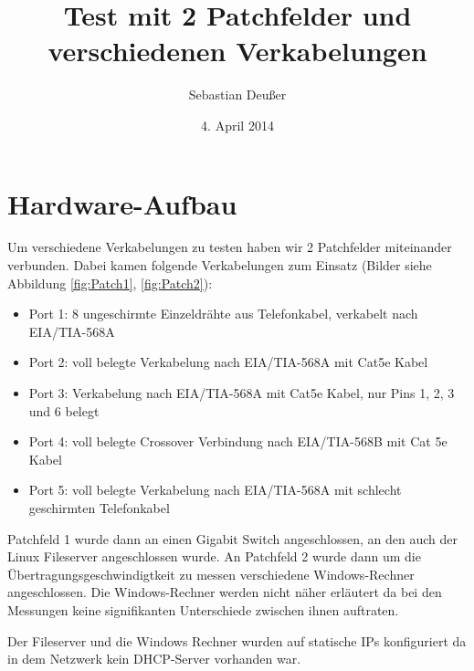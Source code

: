 \documentclass[11pt,a4paper,titlepage]{scrartcl} %
\title{Test mit 2 Patchfelder und verschiedenen Verkabelungen}
\author{Sebastian Deußer}
\date{4. April 2014} %
\begin{document}
\maketitle %

\pagestyle{fancy}
\lhead{}
\chead{\leftmark}
\rhead{}
\cfoot{}

\thispagestyle{fancy}

\section{Hardware-Aufbau}
Um verschiedene Verkabelungen zu testen haben wir 2 Patchfelder miteinander verbunden. Dabei kamen folgende Verkabelungen zum Einsatz (Bilder siehe Abbildung \ref{fig:Patch1}, \ref{fig:Patch2}):
\begin{itemize}
\item Port 1: 8 ungeschirmte Einzeldrähte aus Telefonkabel, verkabelt nach EIA/TIA-568A
\item Port 2: voll belegte Verkabelung nach EIA/TIA-568A mit Cat5e Kabel
\item Port 3: Verkabelung nach EIA/TIA-568A mit Cat5e Kabel, nur Pins 1, 2, 3 und 6 belegt
\item Port 4: voll belegte Crossover Verbindung nach EIA/TIA-568B mit Cat 5e Kabel
\item Port 5: voll belegte Verkabelung nach EIA/TIA-568A mit schlecht geschirmten Telefonkabel
\end{itemize}
Patchfeld 1 wurde dann an einen Gigabit Switch angeschlossen, an den auch der Linux Fileserver angeschlossen wurde. An Patchfeld 2 wurde dann um die Übertragungsgeschwindigtkeit zu messen verschiedene Windows-Rechner angeschlossen. Die Windows-Rechner werden nicht näher erläutert da bei den Messungen keine signifikanten Unterschiede zwischen ihnen auftraten.

Der Fileserver und die Windows Rechner wurden auf statische IPs konfiguriert da in dem Netzwerk kein DHCP-Server vorhanden war.\newpage
\end{document}

